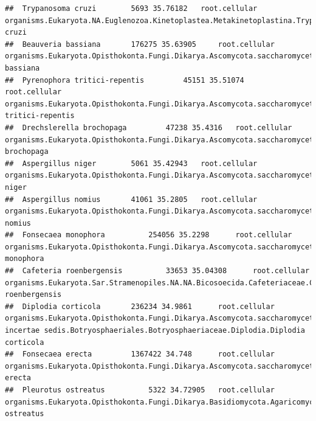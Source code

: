 \documentclass{article}\usepackage[]{graphicx}\usepackage[]{color}
\makeatletter
\newenvironment{kframe}{%
 \def\at@end@of@kframe{}%
 \ifinner\ifhmode%
  \def\at@end@of@kframe{\end{minipage}}%
  \begin{minipage}{\columnwidth}%
 \fi\fi%
 \def\FrameCommand##1{\hskip\@totalleftmargin \hskip-\fboxsep
 \colorbox{shadecolor}{##1}\hskip-\fboxsep
     \hskip-\linewidth \hskip-\@totalleftmargin \hskip\columnwidth}%
 \MakeFramed {\advance\hsize-\width
   \@totalleftmargin\z@ \linewidth\hsize
   \@setminipage}}%
 {\par\unskip\endMakeFramed%
 \at@end@of@kframe}
\newenvironment{knitrout}{}{} %
\makeatother
\begin{document}
\begin{knitrout}
\begin{kframe}
\begin{verbatim}
##  Trypanosoma cruzi 		 5693 35.76182 	 root.cellular organisms.Eukaryota.NA.Euglenozoa.Kinetoplastea.Metakinetoplastina.Trypanosomatida.Trypanosomatidae.Trypanosoma.Schizotrypanum.Trypanosoma cruzi
##  Beauveria bassiana 		 176275 35.63905 	 root.cellular organisms.Eukaryota.Opisthokonta.Fungi.Dikarya.Ascomycota.saccharomyceta.Pezizomycotina.leotiomyceta.sordariomyceta.Sordariomycetes.Hypocreomycetidae.Hypocreales.Cordycipitaceae.Beauveria.Beauveria bassiana
##  Pyrenophora tritici-repentis 		 45151 35.51074 	 root.cellular organisms.Eukaryota.Opisthokonta.Fungi.Dikarya.Ascomycota.saccharomyceta.Pezizomycotina.leotiomyceta.dothideomyceta.Dothideomycetes.Pleosporomycetidae.Pleosporales.Pleosporineae.Pleosporaceae.Pyrenophora.Pyrenophora tritici-repentis
##  Drechslerella brochopaga 		 47238 35.4316 	 root.cellular organisms.Eukaryota.Opisthokonta.Fungi.Dikarya.Ascomycota.saccharomyceta.Pezizomycotina.Orbiliomycetes.Orbiliales.Orbiliaceae.Drechslerella.Drechslerella brochopaga
##  Aspergillus niger 		 5061 35.42943 	 root.cellular organisms.Eukaryota.Opisthokonta.Fungi.Dikarya.Ascomycota.saccharomyceta.Pezizomycotina.leotiomyceta.Eurotiomycetes.Eurotiomycetidae.Eurotiales.Aspergillaceae.Aspergillus.Circumdati.Aspergillus niger
##  Aspergillus nomius 		 41061 35.2805 	 root.cellular organisms.Eukaryota.Opisthokonta.Fungi.Dikarya.Ascomycota.saccharomyceta.Pezizomycotina.leotiomyceta.Eurotiomycetes.Eurotiomycetidae.Eurotiales.Aspergillaceae.Aspergillus.Aspergillus nomius
##  Fonsecaea monophora 		 254056 35.2298 	 root.cellular organisms.Eukaryota.Opisthokonta.Fungi.Dikarya.Ascomycota.saccharomyceta.Pezizomycotina.leotiomyceta.Eurotiomycetes.Chaetothyriomycetidae.Chaetothyriales.Herpotrichiellaceae.Fonsecaea.Fonsecaea monophora
##  Cafeteria roenbergensis 		 33653 35.04308 	 root.cellular organisms.Eukaryota.Sar.Stramenopiles.NA.NA.Bicosoecida.Cafeteriaceae.Cafeteria.Cafeteria roenbergensis
##  Diplodia corticola 		 236234 34.9861 	 root.cellular organisms.Eukaryota.Opisthokonta.Fungi.Dikarya.Ascomycota.saccharomyceta.Pezizomycotina.leotiomyceta.dothideomyceta.Dothideomycetes.Dothideomycetes incertae sedis.Botryosphaeriales.Botryosphaeriaceae.Diplodia.Diplodia corticola
##  Fonsecaea erecta 		 1367422 34.748 	 root.cellular organisms.Eukaryota.Opisthokonta.Fungi.Dikarya.Ascomycota.saccharomyceta.Pezizomycotina.leotiomyceta.Eurotiomycetes.Chaetothyriomycetidae.Chaetothyriales.Herpotrichiellaceae.Fonsecaea.Fonsecaea erecta
##  Pleurotus ostreatus 		 5322 34.72905 	 root.cellular organisms.Eukaryota.Opisthokonta.Fungi.Dikarya.Basidiomycota.Agaricomycotina.Agaricomycetes.Agaricomycetidae.Agaricales.Pleurotaceae.Pleurotus.Pleurotus ostreatus

\end{verbatim}
\end{kframe}
\end{knitrout}
\end{document}
